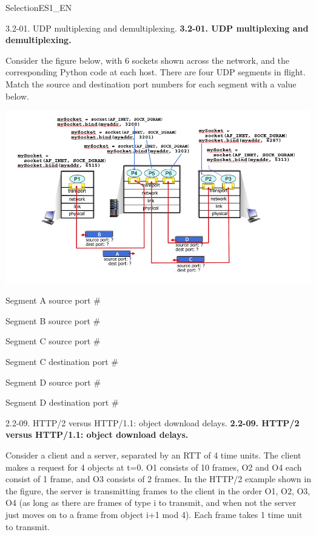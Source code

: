 \documentclass[a4paper]{article}
\begin{document}
\begin{quiz}{SelectionES1\_EN}

\begin{matching}[points=1,shuffle]{3.2-01. UDP multiplexing and demultiplexing.}
\textbf{3.2-01. UDP multiplexing and demultiplexing.} 

Consider the figure below, with 6 sockets shown across the network, and the corresponding Python code at each host. There are four UDP segments in flight. Match the source and destination port numbers for each segment with a value below. 

\begin{center}
\includegraphics[width=\linewidth]{figs/fig1.jpg}
\end{center}
\item Segment A source port \# 
\item Segment B source port \# 
\item Segment C source port \# 
\item Segment C destination port \# 
\item Segment D source port \# 
\item Segment D destination port \# 
\end{matching}

\begin{multi}[points=1]{2.2-09. HTTP/2 versus HTTP/1.1: object download delays.}
\textbf{2.2-09. HTTP/2 versus HTTP/1.1: object download delays.} 

Consider a client and a server, separated by an RTT of 4 time units. The client makes a request for 4 objects at t=0. O1 consists of 10 frames, O2 and O4 each consist of 1 frame, and O3 consists of 2 frames.  In the HTTP/2 example shown in the figure, the server is transmitting frames to the client in the order O1, O2, O3, O4 (as long as there are frames of type i to transmit, and when not the server just moves on to a frame from object i+1 mod 4).  Each frame takes 1 time unit to transmit. 


\end{multi}
\end{quiz}
\end{document}
